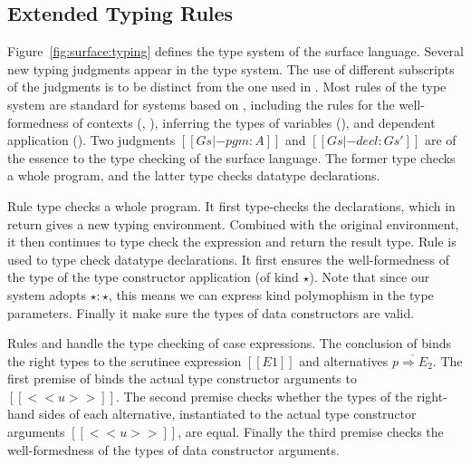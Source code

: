 \subsection{Extended Typing Rules}

Figure~\ref{fig:surface:typing} defines the type system of the surface
language. Several new typing judgments appear in the type system. The
use of different subscripts of the judgments is to be distinct from
the one used in \name. Most rules of the type system are standard for
systems based on \coc, including the rules for the well-formedness of
contexts (, ), inferring the
types of variables (), and dependent application
(). Two judgments $[[Gs |- pgm : A]]$ and
$[[Gs |- decl : Gs']]$ are of the essence to the type checking of the
surface language. The former type checks a whole program, and the
latter type checks datatype declarations.

Rule  type checks a whole program. It first
type-checks the declarations, which in return gives a new typing
environment. Combined with the original environment, it then continues
to type check the expression and return the result type. Rule
 is used to type check datatype declarations. It
first ensures the well-formedness of the type of the type constructor
application (of kind $\star$). Note that since our system adopts
$\star : \star$, this means we can express kind polymophism in the
type parameters. Finally it make sure the types of data constructors
are valid.

Rules  and  handle the type
checking of case expressions. The conclusion of 
binds the right types to the scrutinee expression $[[E1]]$ and
alternatives $\overline{p \Rightarrow E_2}$. The first premise of
 binds the actual type constructor arguments to
$[[<<u>>]]$. The second premise checks whether the types of the
right-hand sides of each alternative, instantiated to the actual type
constructor arguments $[[<<u>>]]$, are equal. Finally the third
premise checks the well-formedness of the types of data constructor
arguments.

\begin{figure*}
\ottdefnctxsrc{}
\ottdefnpgmsrc{}
\ottdefndeclsrc{}
\ottdefnpatsrc{}
\ottdefnexprsrc{}
\caption{Typing rules of surface language}
\label{fig:surface:typing}
\end{figure*}

